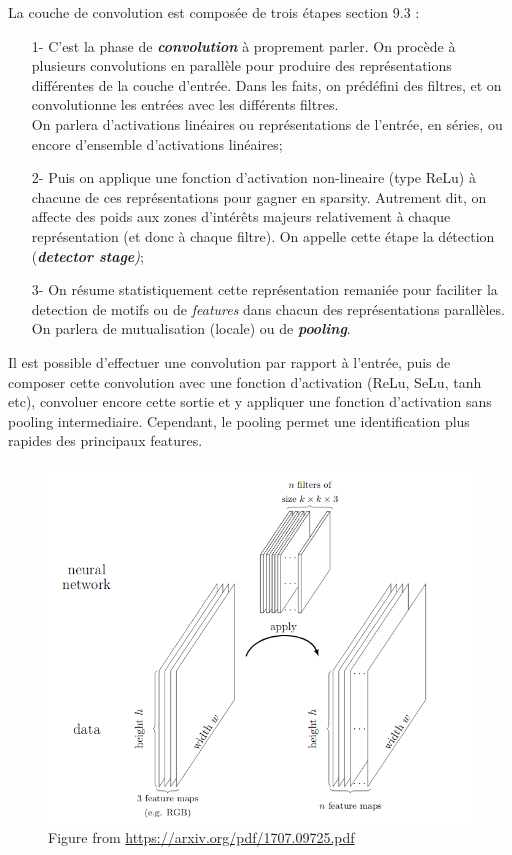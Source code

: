 \documentclass[a4paper,12pt]{report}
\numberwithin{equation}{section} %
\begin{document}
La couche de convolution est composée de trois étapes \citep{Goodfellow-et-al-2016} section 9.3 :
\begin{itemize}[leftmargin=1cm]
	\item[1-] C'est la phase de \textit{\textbf{convolution}} à proprement parler. On procède à plusieurs convolutions en parallèle pour produire des représentations différentes de la couche d'entrée. Dans les faits, on prédéfini des filtres, et on convolutionne les entrées avec les différents filtres. \\ On parlera d'activations linéaires ou représentations de l'entrée, en séries, ou encore d'ensemble d'activations linéaires;
	\item[2-] Puis on applique une fonction d'activation non-lineaire (type ReLu) à chacune de ces représentations pour gagner en sparsity. Autrement dit, on affecte des poids aux zones d'intérêts majeurs relativement à chaque représentation (et donc à chaque filtre). On appelle cette étape la détection (\textit{\textbf{detector stage})};
	\item[3-] On résume statistiquement cette représentation remaniée pour faciliter la detection de motifs ou de \textit{features} dans chacun des représentations parallèles. On parlera de mutualisation (locale) ou de \textit{\textbf{pooling}}. 
\end{itemize}

Il est possible d'effectuer une convolution par rapport à l'entrée, puis de composer cette convolution avec une fonction d'activation (ReLu, SeLu, tanh etc), convoluer encore cette sortie et y appliquer une fonction d'activation sans pooling intermediaire. Cependant, le pooling permet une identification plus rapides des principaux features.

\begin{figure}[!ht]
\centering
\includegraphics[scale=0.43]{feature_maps.png}
\captionsetup{labelformat=empty}
\caption{Figure from \url{https://arxiv.org/pdf/1707.09725.pdf}}
\end{figure}
\end{document}
